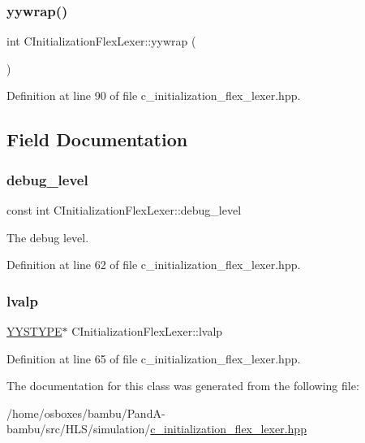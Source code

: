 \subsubsection{\texorpdfstring{yywrap()}{yywrap()}}
{\footnotesize\ttfamily int C\+Initialization\+Flex\+Lexer\+::yywrap (\begin{DoxyParamCaption}{ }\end{DoxyParamCaption})\hspace{0.3cm}{\ttfamily [inline]}}



Definition at line 90 of file c\+\_\+initialization\+\_\+flex\+\_\+lexer.\+hpp.



\subsection{Field Documentation}
\mbox{\label{classCInitializationFlexLexer_a7f920df59c77d437db114d090bc6b735}} 
\subsubsection{\texorpdfstring{debug\+\_\+level}{debug\_level}}
{\footnotesize\ttfamily const int C\+Initialization\+Flex\+Lexer\+::debug\+\_\+level\hspace{0.3cm}{\ttfamily [protected]}}



The debug level. 



Definition at line 62 of file c\+\_\+initialization\+\_\+flex\+\_\+lexer.\+hpp.

\mbox{\label{classCInitializationFlexLexer_a1ae3c38baaaa5905f5cc6a38863f9dc7}} 
\subsubsection{\texorpdfstring{lvalp}{lvalp}}
{\footnotesize\ttfamily \hyperlink{asn__parser_8cpp_a2ceb5b985e149f18e018b142cfdd7264}{Y\+Y\+S\+T\+Y\+PE}$\ast$ C\+Initialization\+Flex\+Lexer\+::lvalp}



Definition at line 65 of file c\+\_\+initialization\+\_\+flex\+\_\+lexer.\+hpp.



The documentation for this class was generated from the following file\+:\begin{DoxyCompactItemize}
\item 
/home/osboxes/bambu/\+Pand\+A-\/bambu/src/\+H\+L\+S/simulation/\hyperlink{c__initialization__flex__lexer_8hpp}{c\+\_\+initialization\+\_\+flex\+\_\+lexer.\+hpp}\end{DoxyCompactItemize}
